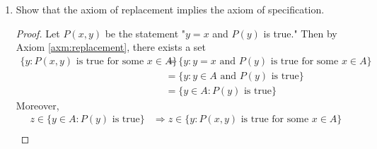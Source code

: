 \documentclass[../main.tex]{subfiles}
\begin{document}
\begin{enumerate}[ref={\thesection.\arabic*}]
\begin{proof}
\begin{lem}
\begin{proof}
                To prove $(A\cup B)\setminus A=B\setminus A$, Definition \ref{dfn:setEquality} tells us that it will suffice to show that every element $x$ of $(A\cup B)\setminus A$ is an element of $B\setminus A$ and vice versa. Suppose first that $x\in(A\cup B)\setminus A$. Then by Definition \ref{dfn:differenceSets}, $x\in A\cup B$ and $x\notin A$. Since $x\in A\cup B$, by Axiom \ref{axm:pairwiseUnion}, $x\in A$ or $x\in B$. But $x\notin A$, so $x$ must be an element of $B$. Having established that $x\in B$ and $x\notin A$, Definition \ref{dfn:differenceSets} tells us that $x\in B\setminus A$. Now suppose that $x\in B\setminus A$. Then by Definition \ref{dfn:differenceSets}, $x\in B$ and $x\notin A$. Since $x\in B$, by Axiom \ref{axm:pairwiseUnion}, $x\in A\cup B$. Consequently, by Definition \ref{dfn:differenceSets}, $x\in(A\cup B)\setminus A$.
            \end{proof}
        \end{lem}
        Now we can begin. By Exercise \ref{exr:3.1.7}, $A\cap B\subseteq A$ and $A\subseteq A\cup B$. This implies by Proposition \ref{prp:subsetTransitive} that $A\cap B\subseteq A\cup B$. Thus,
        \begin{align*}
            A\cup B &= (A\cap B)\cup((A\cup B)\setminus(A\cap B))\tag*{Exercise \ref{exr:3.1.6g}}\\
            &= (A\cap B)\cup((A\cup B)\setminus A)\cup((A\cup B)\setminus B)\tag*{Exercise \ref{exr:3.1.6h}}\\
            &= (A\cap B)\cup(B\setminus A)\cup(A\setminus B)\tag*{Lemma \ref{lem:unionMinus}}
        \end{align*}
    \end{proof}
    \item \label{exr:3.1.11}Show that the axiom of replacement implies the axiom of specification.
    \begin{proof}
        Let $P(x,y)$ be the statement "$y=x$ and $P(y)$ is true." Then by Axiom \ref{axm:replacement}, there exists a set
        \begin{align*}
            \{y:P(x,y)\text{ is true for some }x\in A\} &= \{y:y=x\text{ and }P(y)\text{ is true for some }x\in A\}\\
            &= \{y:y\in A\text{ and }P(y)\text{ is true}\}\\
            &= \{y\in A:P(y)\text{ is true}\}
        \end{align*}
        Moreover,
        \begin{align*}
            z\in \{y\in A:P(y)\text{ is true}\} &\Longrightarrow z\in\{y:P(x,y)\text{ is true for some }x\in A\}\\

\end{align*}
\end{proof}
\end{enumerate}
\end{document}
